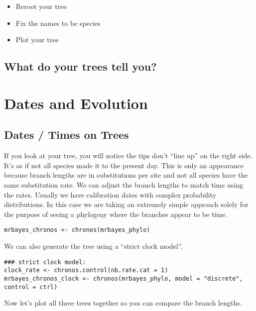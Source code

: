 \documentclass[
]{book}
\providecommand{\tightlist}{%
  \setlength{\itemsep}{0pt}\setlength{\parskip}{0pt}}
\begin{document}
\begin{itemize}
\tightlist
\item
  Reroot your tree
\item
  Fix the names to be species
\item
  Plot your tree
\end{itemize}

\hypertarget{what-do-your-trees-tell-you}{%
\section{What do your trees tell you?}\label{what-do-your-trees-tell-you}}

\hypertarget{dates-and-evolution}{%
\chapter{Dates and Evolution}\label{dates-and-evolution}}

\hypertarget{dates-times-on-trees}{%
\section{Dates / Times on Trees}\label{dates-times-on-trees}}

If you look at your tree, you will notice the tips don't ``line up''
on the right side.
It's as if not all species made it to the present day.
This is only an appearance because branch lengths are in substitutions per site and not
all species have the same substitution rate.
We can adjust the branch lengths to match time using the rates.
Usually we have calibration dates with complex probability distributions.
In this case we are taking an extremely simple approach solely for the purpose of seeing
a phylogeny where the branches appear to be time.

\begin{verbatim}
mrbayes_chronos <- chronos(mrbayes_phylo)
\end{verbatim}

We can also generate the tree using a ``strict clock model''.

\begin{verbatim}
### strict clock model:
clock_rate <- chronos.control(nb.rate.cat = 1)
mrbayes_chronos_clock <- chronos(mrbayes_phylo, model = "discrete", control = ctrl)
\end{verbatim}

Now let's plot all three trees together so you can compare the branch lengths.
\end{document}
